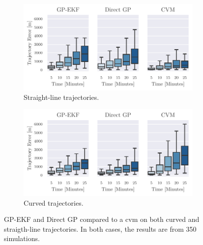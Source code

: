 \begin{figure}
    \centering
    \begin{subfigure}{\textwidth}
        \includegraphics[width=\textwidth]{figures/straight_line_stats/both_vs_cvm.pdf}

        \caption{Straight-line trajectories.}
        \label{fig:stats_curved_both_vs_cvm}
    \end{subfigure}
    \begin{subfigure}{\textwidth}
        \includegraphics[width=\textwidth]{figures/curved_line_stats/both_vs_cvm.pdf}
        \caption{Curved trajectories.}
        \label{fig:stats_straight_both_vs_cvm}
    \end{subfigure}
    \caption{GP-EKF and Direct GP compared to a \acrshort{cvm} on both curved and straigth-line trajectories. In both cases, the results are from 350 simulations.}
    \label{fig:stats_both_vs_cvm}
\end{figure}



